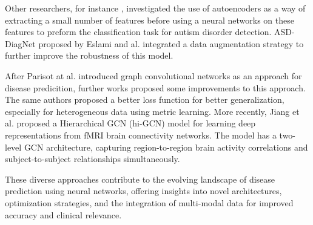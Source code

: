 \documentclass[sigconf]{acmart}
\begin{document}
Other researchers, for instance \cite{Kong2019}, investigated the use of autoencoders as a way of extracting a small number of features before using a neural networks on these features to preform the classification task for autism disorder detection. ASD-DiagNet proposed by Eslami and al. \cite{Eslami2019} integrated a data augmentation strategy to further improve the robustness of this model.

After Parisot at al. introduced graph convolutional networks as an approach for disease predicition, further works proposed some improvements to this approach. The same authors proposed a better loss function for better generalization, especially for heterogeneous data using metric learning. More recently, Jiang et al. \cite{Jiang2020} proposed a Hierarchical GCN (hi-GCN) model for learning deep representations from fMRI brain connectivity networks. The model has a two-level GCN architecture, capturing region-to-region brain activity correlations and subject-to-subject relationships simultaneously.

These diverse approaches contribute to the evolving landscape of disease prediction using neural networks, offering insights into novel architectures, optimization strategies, and the integration of multi-modal data for improved accuracy and clinical relevance.



\end{document}
